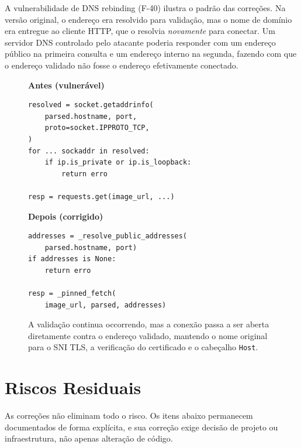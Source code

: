 \documentclass[12pt,a4paper]{article}
\begin{document}
A vulnerabilidade de DNS rebinding (F-40) ilustra o padrão das correções. Na
versão original, o endereço era resolvido para validação, mas o nome de
domínio era entregue ao cliente HTTP, que o resolvia \emph{novamente} para
conectar. Um servidor DNS controlado pelo atacante poderia responder com um
endereço público na primeira consulta e um endereço interno na segunda,
fazendo com que o endereço validado não fosse o endereço efetivamente
conectado.

\begin{figure}[H]
\centering
\begin{minipage}[t]{0.48\textwidth}
\textbf{Antes (vulnerável)}
\begin{lstlisting}[basicstyle=\ttfamily\footnotesize,frame=single,breaklines=true]
resolved = socket.getaddrinfo(
    parsed.hostname, port,
    proto=socket.IPPROTO_TCP,
)
for ... sockaddr in resolved:
    if ip.is_private or ip.is_loopback:
        return erro

resp = requests.get(image_url, ...)
\end{lstlisting}
\end{minipage}
\hfill
\begin{minipage}[t]{0.48\textwidth}
\textbf{Depois (corrigido)}
\begin{lstlisting}[basicstyle=\ttfamily\footnotesize,frame=single,breaklines=true]
addresses = _resolve_public_addresses(
    parsed.hostname, port)
if addresses is None:
    return erro

resp = _pinned_fetch(
    image_url, parsed, addresses)
\end{lstlisting}
\end{minipage}
\caption{A validação continua occorrendo, mas a conexão passa a ser aberta
diretamente contra o endereço validado, mantendo o nome original para o SNI
TLS, a verificação do certificado e o cabeçalho \texttt{Host}.}
\label{fig:rebinding}
\end{figure}

\section{Riscos Residuais}\label{sec:riscos}

As correções não eliminam todo o risco. Os itens abaixo permanecem
documentados de forma explícita, e sua correção exige decisão de projeto ou
infraestrutura, não apenas alteração de código.
\end{document}
